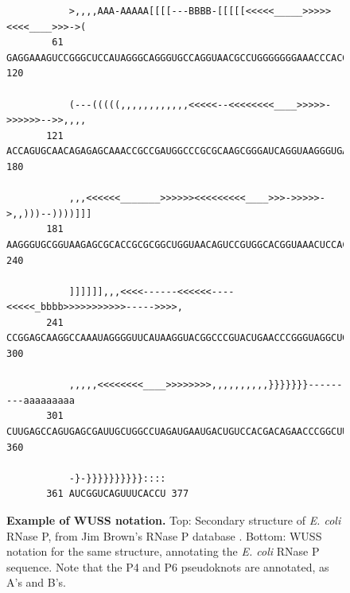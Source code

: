 \begin{figure}[tp]
\begin{center}
{\begin{BVerbatim}
           >,,,,AAA-AAAAA[[[[---BBBB-[[[[[<<<<<_____>>>>><<<<____>>>->(
        61 GAGGAAAGUCCGGGCUCCAUAGGGCAGGGUGCCAGGUAACGCCUGGGGGGGAAACCCACG 120

           (---(((((,,,,,,,,,,,,<<<<<--<<<<<<<<____>>>>>->>>>>>-->>,,,,
       121 ACCAGUGCAACAGAGAGCAAACCGCCGAUGGCCCGCGCAAGCGGGAUCAGGUAAGGGUGA 180

           ,,,<<<<<<_______>>>>>><<<<<<<<<____>>>->>>>>->,,)))--))))]]]
       181 AAGGGUGCGGUAAGAGCGCACCGCGCGGCUGGUAACAGUCCGUGGCACGGUAAACUCCAC 240

           ]]]]]],,,<<<<------<<<<<<----<<<<<_bbbb>>>>>>>>>>>----->>>>,
       241 CCGGAGCAAGGCCAAAUAGGGGUUCAUAAGGUACGGCCCGUACUGAACCCGGGUAGGCUG 300

           ,,,,,<<<<<<<<____>>>>>>>>,,,,,,,,,,}}}}}}}---------aaaaaaaaa
       301 CUUGAGCCAGUGAGCGAUUGCUGGCCUAGAUGAAUGACUGUCCACGACAGAACCCGGCUU 360

           -}-}}}}}}}}}}::::
       361 AUCGGUCAGUUUCACCU 377
\end{BVerbatim}
}
\end{center}
\caption{\small \textbf{Example of WUSS notation.} Top: Secondary
structure of \emph{E. coli} RNase P, from Jim Brown's RNase P database
\citep{Brown99}. Bottom: WUSS notation for the same structure,
annotating the \emph{E. coli} RNase P sequence. Note that the P4 and P6
pseudoknots are annotated, as A's and B's.}
\label{fig:RNaseP}
\end{figure}

